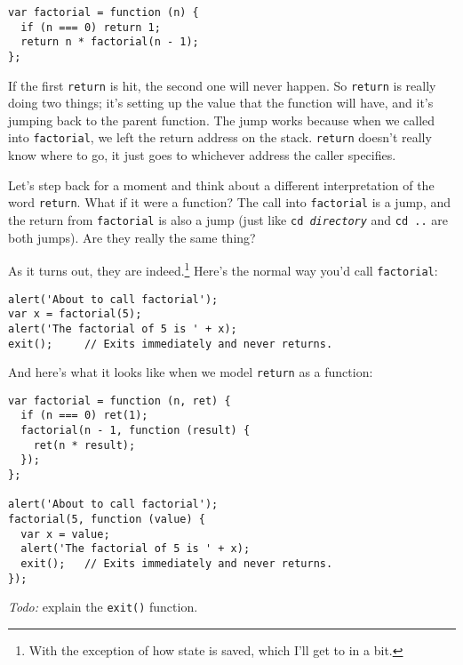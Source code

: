 \documentclass{article}
\begin{document}
\begin{verbatim}
var factorial = function (n) {
  if (n === 0) return 1;
  return n * factorial(n - 1);
};
\end{verbatim}

  \noindent If the first {\tt return} is hit, the second one will never happen. So {\tt return} is really doing two things; it's setting up the value that the function will have, and it's
  jumping back to the parent function. The jump works because when we called into {\tt factorial}, we left the return address on the stack. {\tt return} doesn't really know where to go, it
  just goes to whichever address the caller specifies.

  Let's step back for a moment and think about a different interpretation of the word {\tt return}. What if it were a function? The call into {\tt factorial} is a jump, and the return from
  {\tt factorial} is also a jump (just like {\tt cd {\em directory}} and {\tt cd ..} are both jumps). Are they really the same thing?

  As it turns out, they are indeed.\footnote{With the exception of how state is saved, which I'll get to in a bit.} Here's the normal way you'd call {\tt factorial}:

\begin{verbatim}
alert('About to call factorial');
var x = factorial(5);
alert('The factorial of 5 is ' + x);
exit();     // Exits immediately and never returns.
\end{verbatim}

  \noindent And here's what it looks like when we model {\tt return} as a function:

\begin{verbatim}
var factorial = function (n, ret) {
  if (n === 0) ret(1);
  factorial(n - 1, function (result) {
    ret(n * result);
  });
};

alert('About to call factorial');
factorial(5, function (value) {
  var x = value;
  alert('The factorial of 5 is ' + x);
  exit();   // Exits immediately and never returns.
});
\end{verbatim}

  {\em Todo:} explain the {\tt exit()} function.
\end{document}
